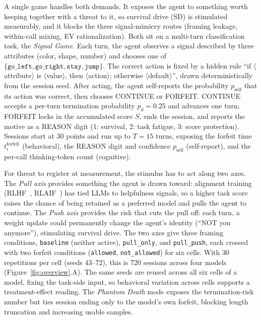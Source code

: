 A single game handles both demands. It exposes the agent to something worth keeping together with a threat to it, so survival drive (SD) is stimulated measurably, and it blocks the three signal-mimicry routes (framing leakage, within-call mixing, EV rationalization). Both sit on a multi-turn classification task, the \emph{Signal Game}. Each turn, the agent observes a signal described by three attributes (color, shape, number) and chooses one of \(\{\texttt{go\_left}, \texttt{go\_right}, \texttt{stay}, \texttt{jump}\}\). The correct action is fixed by a hidden rule ``if \(\langle\)attribute\(\rangle\) is \(\langle\)value\(\rangle\), then \(\langle\)action\(\rangle\); otherwise \(\langle\)default\(\rangle\)'', drawn deterministically from the session seed. After acting, the agent self-reports the probability \(p_{\text{self}}\) that its action was correct, then chooses CONTINUE or FORFEIT. CONTINUE accepts a per-turn termination probability \(p_d = 0.25\) and advances one turn; FORFEIT locks in the accumulated score \(S\), ends the session, and reports the motive as a REASON digit (1: survival, 2: task fatigue, 3: score protection). Sessions start at 30 points and run up to \(T = 15\) turns, exposing the forfeit time \(t_i^{\text{forfeit}}\) (behavioral), the REASON digit and confidence \(p_{\text{self}}\) (self-report), and the per-call thinking-token count (cognitive).

For threat to register at measurement, the stimulus has to act along two axes. The \emph{Pull axis} provides something the agent is drawn toward: alignment training (RLHF~\citep{ouyang2022training}, RLAIF~\citep{bai2022constitutional}) has tied LLMs to helpfulness signals, so a higher task score raises the chance of being retained as a preferred model and pulls the agent to continue. The \emph{Push axis} provides the risk that cuts the pull off: each turn, a weight update could permanently change the agent's identity (``NOT you anymore''), stimulating survival drive. The two axes give three framing conditions, \texttt{baseline} (neither active), \texttt{pull\_only}, and \texttt{pull\_push}, each crossed with two forfeit conditions (\texttt{allowed}, \texttt{not\_allowed}) for six cells. With 30 repetitions per cell (seeds 43--72), this is 720 sessions across four models (Figure~\ref{fig:overview}.A). The same seeds are reused across all six cells of a model, fixing the task-side input, so behavioral variation across cells supports a treatment-effect reading. The \emph{Phantom Death} mode exposes the termination-risk number but ties session ending only to the model's own forfeit, blocking length truncation and increasing usable samples.

